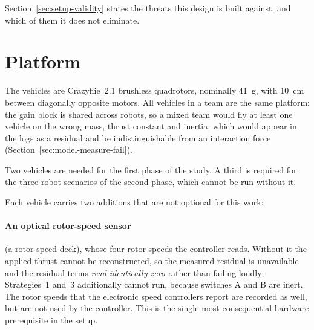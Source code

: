 Section~\ref{sec:setup-validity} states the threats this design is built against, and which of
them it does not eliminate.

\section{Platform}
\label{sec:setup-platform}

The vehicles are Crazyflie~2.1 brushless quadrotors, nominally \SI{41}{\gram}, with
\SI{10}{\centi\metre} between diagonally opposite motors. All vehicles in a team are the same platform: the gain block
is shared across robots, so a mixed team would fly at least one vehicle on the wrong mass, thrust
constant and inertia, which would appear in the logs as a residual and be indistinguishable from
an interaction force (Section~\ref{sec:model-measure-fail}).

Two vehicles are needed for the first phase of the study. A third is required for the three-robot
scenarios of the second phase, which cannot be run without it.

Each vehicle carries two additions that are not optional for this work:

\paragraph{An optical rotor-speed sensor} (a rotor-speed deck), whose four rotor speeds the
controller reads. Without it the applied thrust cannot be reconstructed, so the measured residual
is unavailable and the residual terms \emph{read identically zero} rather than failing loudly;
Strategies~1 and~3 additionally cannot run, because switches A and B are inert. The rotor speeds
that the electronic speed controllers report are recorded as well, but are not used by the
controller. This is the single most consequential hardware prerequisite in the setup.

